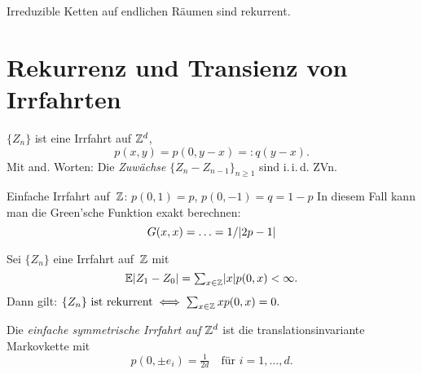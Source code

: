 \documentclass{cheat-sheet}
\newcommand{\E}{\mathbb{E}} %
\newcommand{\iid}{i.\,i.\,d.} %
\begin{document}

\begin{satz}
  Irreduzible Ketten auf endlichen Räumen sind rekurrent.
\end{satz}

\section{Rekurrenz und Transienz von Irrfahrten}

\begin{situation}
  $\{ Z_n \}$ ist eine Irrfahrt auf $\mathbb{Z}^d$, \dh{}
  \[ p(x, y) = p(0, y - x) =: q(y - x). \]
  Mit and. Worten: Die \textit{Zuwächse} $\{ Z_n - Z_{n-1} \}_{n \geq 1}$ sind \iid{} ZVn.
\end{situation}

\begin{bsp}
  Einfache Irrfahrt auf~$\mathbb{Z}$: \quad
  $p(0, 1) = p$, $p(0, -1) = q = 1 - p$
  In diesem Fall kann man die Green'sche Funktion exakt berechnen:
  \[
    G(x, x) = \ldots = 1/\lvert2p - 1\rvert
  \]
\end{bsp}

\begin{satz}
  Sei $\{ Z_n \}$ eine Irrfahrt auf~$\mathbb{Z}$ mit
  \[ \E \abs{Z_1 - Z_0} = {\sum}_{x \in \Z} \abs{x} p(0, x) < \infty. \]
  Dann gilt: \quad
  $
    \{ Z_n \} \text{ ist rekurrent} \iff {\sum}_{x \in \Z} \, x p(0, x) = 0.
  $
\end{satz}

\begin{defn}
  Die \emph{einfache symmetrische Irrfahrt auf $\mathbb{Z}^d$} ist die translationsinvariante Markovkette mit
  \[
    p(0, \pm e_i) = \tfrac{1}{2 d} \quad \text{für } i = 1, \ldots, d.
  \]
\end{defn}
\end{document}
